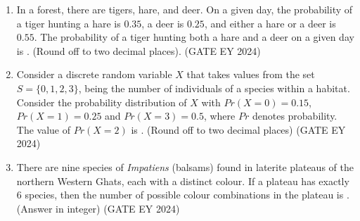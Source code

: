 \documentclass[journal]{IEEEtran}
\begin{document}
\begin{enumerate}
\item In a forest, there are tigers, hare, and deer. On a given day, the probability of a tiger hunting a hare is $0.35$, a deer is $0.25$, and either a hare or a deer is $0.55$. The probability of a tiger hunting both a hare and a deer on a given day is \underline{\hspace{3cm}}. (Round off to two decimal places).
\hfill{(GATE EY 2024)}

\item Consider a discrete random variable $X$ that takes values from the set $S = \{0, 1, 2, 3\}$, being the number of individuals of a species within a habitat. Consider the probability distribution of $X$ with $Pr(X = 0) = 0.15$, $Pr(X = 1) = 0.25$ and $Pr(X = 3) = 0.5$, where $Pr$ denotes probability. The value of $Pr(X = 2)$ is \underline{\hspace{3cm}}. (Round off to two decimal places)
\hfill{(GATE EY 2024)}

\item There are nine species of \textit{Impatiens} (balsams) found in laterite plateaus of the northern Western Ghats, each with a distinct colour. If a plateau has exactly $6$ species, then the number of possible colour combinations in the plateau is \underline{\hspace{3cm}}. (Answer in integer)
\hfill{(GATE EY 2024)}

\end{enumerate}
\bigskip
{}
\end{document}
